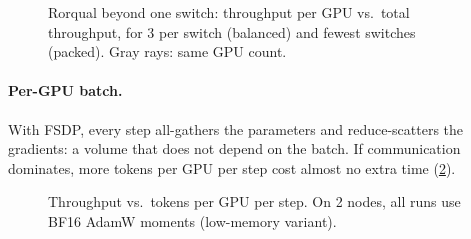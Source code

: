 \begin{figure}[h]
  \centering{}
  \caption{Rorqual beyond one switch: throughput per GPU vs.\ total throughput, for 3 per switch
    (balanced) and fewest switches (packed). Gray rays: same GPU count. }
  \label{fig:placement-at-scale}
\end{figure}


\paragraph{Per-GPU batch.} With FSDP, every step all-gathers the parameters and reduce-scatters the
gradients: a volume that does not depend on the batch. If communication dominates, more tokens per GPU
per step cost almost no extra time (\cref{fig:batch}).

\begin{figure}[h]
  \centering{}
  \caption{Throughput vs.\ tokens per GPU per step. On 2 nodes, all runs use BF16 AdamW moments (low-memory
    variant).}
  \label{fig:batch}
\end{figure}

